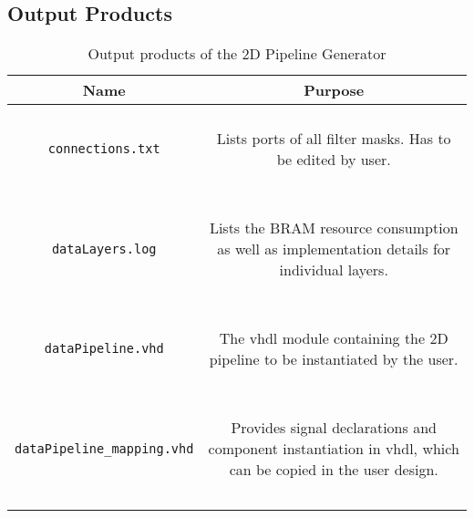 \subsection{Output Products}

\begin{longtable}[ht]{|c|c|}
\hline 
\textbf{Name} & \textbf{Purpose}\\
\hline 
\hline 
\endhead

\texttt{connections.txt} & 
\parbox{7cm}{ ~ \\ 
Lists ports of all filter masks. Has to be edited by user.
\\ ~ } \\

\hline 

\texttt{dataLayers.log} & 
\parbox{7cm}{ ~ \\ 
Lists the BRAM resource consumption as well as implementation details for individual layers.
\\ ~ } \\

\hline 

\texttt{dataPipeline.vhd} & 
\parbox{7cm}{~ \\ 
The vhdl module containing the 2D pipeline to be instantiated by the user.
\\ ~ } \\

\hline 

\texttt{dataPipeline\_mapping.vhd} & 
\parbox{7cm}{~ \\ 
Provides signal declarations and component instantiation in vhdl, which can be copied in the user design.
\\ ~ } \\

\hline 

\caption{Output products of the 2D Pipeline Generator} \label{06-04-pipeline-generator-output}\\
\end{longtable}